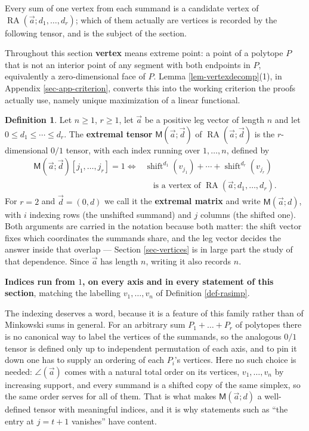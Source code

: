 \documentclass[11pt, a4paper, abstract=yes]{scrartcl}
\theoremstyle{definition}
\newtheorem{definition}{Definition}
\theoremstyle{remark}
\theoremstyle{plain}
\newcommand{\shift}{\operatorname{shift}}
\newcommand{\rasimp}{\angle}
\newcommand{\RA}{\operatorname{RA}}
\newcommand{\extten}{\mathsf{M}}
\begin{document}
Every sum of one vertex from each summand is a candidate vertex of \(\RA(\vec a;d_1,\dots,d_r)\);
which of them actually are vertices is recorded by the following tensor, and is the subject of the
section.

Throughout this section \textbf{vertex} means extreme point: a point of a polytope \(P\) that is not an
interior point of any segment with both endpoints in \(P\), equivalently a zero-dimensional face of
\(P\). Lemma \ref{lem-vertexdecomp}(1), in Appendix \ref{sec-app-criterion}, converts this into the
working criterion the proofs actually use, namely
unique maximization of a linear functional.

\begin{definition}
Let \(n\ge1\), \(r\ge1\), let \(\vec a\) be a positive leg vector of length \(n\) and let
\(0\le d_1\le\cdots\le d_r\). The \textbf{extremal tensor} \(\extten(\vec a;\vec d)\) of
\(\RA(\vec a;\vec d)\) is the \(r\)-dimensional \(0/1\) tensor, with each index running over
\(1,\dots,n\), defined by
\begin{equation}\label{eq:extten}
\begin{split}
  \extten(\vec a;\vec d)[j_1,\dots,j_r]=1 \iff{}
    &\shift^{d_1}(v_{j_1})+\cdots+\shift^{d_r}(v_{j_r})\\
    &\quad\text{is a vertex of }\RA(\vec a;d_1,\dots,d_r).
\end{split}
\end{equation}
For \(r=2\) and \(\vec d=(0,d)\) we call it the \textbf{extremal matrix} and write \(\extten(\vec a;d)\),
with \(i\) indexing rows (the unshifted summand) and \(j\) columns (the shifted one).
Both arguments are carried in the notation because both matter: the shift vector fixes which
coordinates the summands share, and the leg vector decides the answer inside that overlap ---
Section \ref{sec-vertices} is in large part the study of that dependence. Since \(\vec a\) has length
\(n\), writing it also records \(n\).
\label{def-extten}
\end{definition}

\textbf{Indices run from \(1\), on every axis and in every statement of this section}, matching the
labelling \(v_1,\dots,v_n\) of Definition \ref{def-rasimp}.

The indexing deserves a word, because it is a feature of this family rather than of Minkowski sums
in general. For an arbitrary sum \(P_1+\dots+P_r\) of polytopes there is no canonical way to label
the vertices of the summands, so the analogous \(0/1\) tensor is defined only up to independent
permutation of each axis, and to pin it down one has to supply an ordering of each \(P_i\)'s
vertices. Here no such choice is needed: \(\rasimp(\vec a)\) comes with a natural total order on its
vertices, \(v_1,\dots,v_n\) by increasing support, and every summand is a shifted copy of the same
simplex, so the same order serves for all of them. That is what makes \(\extten(\vec a;d)\) a well-defined tensor
with meaningful indices, and it is why statements such as ``the entry at \(j=t+1\) vanishes'' have
content.
\end{document}
